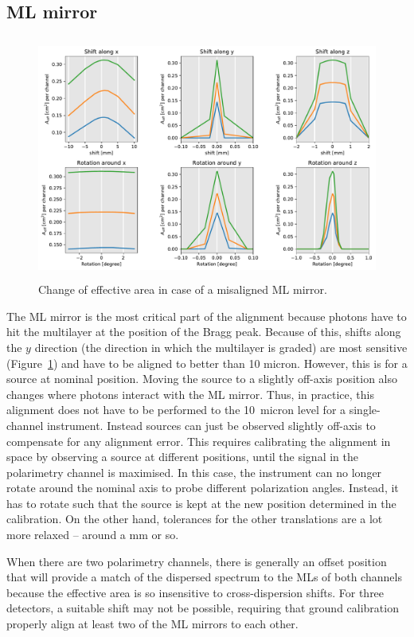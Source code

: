 \documentclass[]{spie}  %
\begin{document}
\subsection{ML mirror}
\begin{figure} [ht]
  \begin{center}
    \includegraphics[height=8cm]{LGML_global.pdf}
  \end{center}
  \caption
      { \label{fig:LGML_global}Change of effective area in case of a misaligned ML mirror. 
}
\end{figure}

The ML mirror is the most critical part of the alignment because photons have
to hit the multilayer at the position of the Bragg peak. Because of
this, shifts along the $y$ direction (the direction in which the
multilayer is graded) are most sensitive
(Figure~\ref{fig:LGML_global}) and have to be aligned to better than
10 micron. However, this is for a source at nominal position. Moving
the source to a slightly off-axis position also changes where photons
interact with the ML mirror. Thus, in practice, this alignment does
not have to be performed to the 10~micron level for a single-channel
instrument. Instead sources can just be observed slightly off-axis to
compensate for any alignment error. This requires calibrating the
alignment in space by observing a source at different positions, until
the signal in the polarimetry channel is maximised. In this case, the
instrument can no longer rotate around the nominal axis to probe
different polarization angles. Instead, it has to rotate such that the
source is kept at the new position determined in the calibration. On
the other hand, tolerances for the other translations are a lot more
relaxed -- around a mm or so.

When there are two polarimetry channels,
there is generally an offset position
that will provide a match of the dispersed spectrum to the MLs
of both channels because
the effective area is so insensitive to cross-dispersion shifts.
For three detectors, a suitable shift may not be possible,
requiring that ground calibration properly align at least
two of the ML mirrors to each other.
\end{document}
